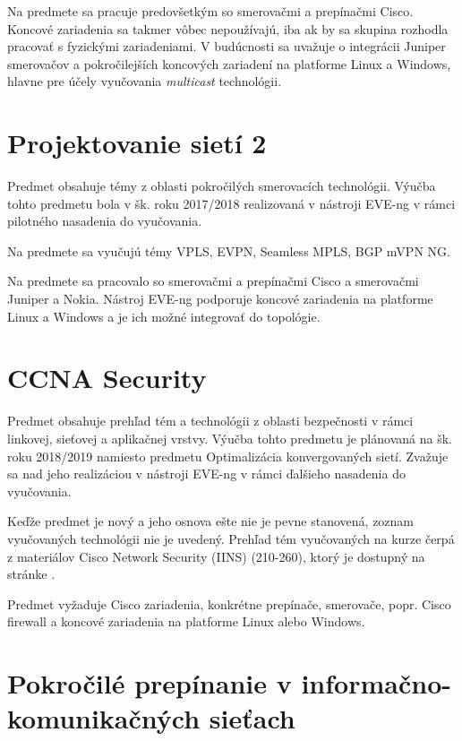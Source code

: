Na predmete sa pracuje predovšetkým so smerovačmi a prepínačmi Cisco. Koncové zariadenia sa takmer vôbec nepoužívajú, iba ak by sa skupina rozhodla pracovať s fyzickými zariadeniami. V budúcnosti sa uvažuje o integrácii Juniper smerovačov a pokročilejších koncových zariadení na platforme Linux a Windows, hlavne pre účely vyučovania \emph{multicast} technológii.



\section{Projektovanie sietí 2}

Predmet obsahuje témy z oblasti pokročilých smerovacích technológii. Výučba tohto predmetu bola v šk. roku 2017/2018 realizovaná v nástroji EVE-ng v rámci pilotného nasadenia do vyučovania.

Na predmete sa vyučujú témy VPLS, EVPN, Seamless MPLS, BGP mVPN NG.


Na predmete sa pracovalo so smerovačmi a prepínačmi Cisco a smerovačmi Juniper a Nokia. Nástroj EVE-ng podporuje koncové zariadenia na platforme Linux a Windows a je ich možné integrovať do topológie.




\section{CCNA Security}
  
Predmet obsahuje prehľad tém a technológii z oblasti bezpečnosti v rámci linkovej, sieťovej a aplikačnej vrstvy. Výučba tohto predmetu je plánovaná na šk. roku 2018/2019 namiesto predmetu Optimalizácia konvergovaných sietí. Zvažuje sa nad jeho realizáciou v nástroji EVE-ng v rámci ďalšieho nasadenia do vyučovania.

Keďže predmet je nový a jeho osnova ešte nie je pevne stanovená, zoznam vyučovaných technológii nie je uvedený. Prehľad tém vyučovaných na kurze čerpá z materiálov Cisco Network Security (IINS) (210-260), ktorý je dostupný na stránke \cite{ccna_security_topics}.

Predmet vyžaduje Cisco zariadenia, konkrétne prepínače, smerovače, popr. Cisco firewall a koncové zariadenia na platforme Linux alebo Windows.





\section{Pokročilé prepínanie v informačno-komunikačných sieťach}

